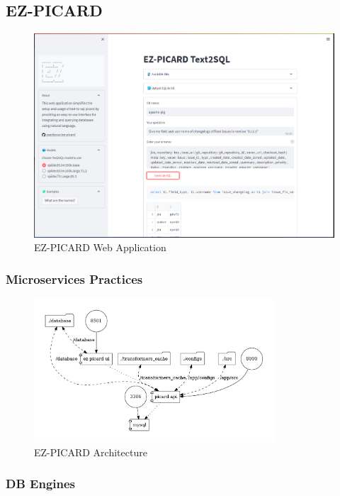 \subsection{EZ-PICARD}

\begin{figure}[ht]
    \centering
    \includegraphics[width=1\textwidth]{pics/ez/ui.png}
    \caption{EZ-PICARD Web Application}
    \label{fig:ezpicard}
\end{figure}

\subsubsection{Microservices Practices}

\begin{figure}[ht]
    \centering
    \includegraphics[width=0.8\textwidth]{pics/ez/map.png}
    \caption{EZ-PICARD Architecture}
\end{figure}


\subsubsection{DB Engines}

